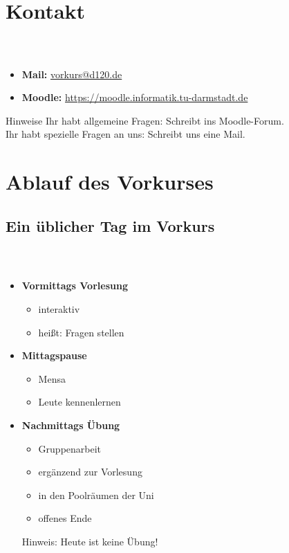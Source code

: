 \section{Kontakt}
\begin{frame}
	\frametitle{\insertsectionhead \\ \insertsubsectionhead}
	\begin{itemize}
		\item \textbf{Mail:} \href{mailto:vorkurs@d120.de}{vorkurs@d120.de}
		\item \textbf{Moodle:}  \href{https://moodle.informatik.tu-darmstadt.de/course/view.php?id=624} {https://moodle.informatik.tu-darmstadt.de}
	\end{itemize}
	\vspace{3.5cm}
	\begin{alertblock}{Hinweise}
		Ihr habt allgemeine Fragen: Schreibt ins Moodle-Forum. \\
		Ihr habt spezielle Fragen an uns: Schreibt uns eine Mail.
	\end{alertblock}
\end{frame}

\section{Ablauf des Vorkurses}
\subsection{Ein üblicher Tag im Vorkurs}
\begin{frame}
	\frametitle{\insertsectionhead \\ {\small \insertsubsectionhead }}
	\begin{itemize}
		\item \textbf{Vormittags Vorlesung}
		\begin{itemize}
			\item interaktiv
			\item heißt: Fragen stellen
		\end{itemize}
		\item \textbf{Mittagspause}
		\begin{itemize}
			\item Mensa
			\item Leute kennenlernen
		\end{itemize}
		\item \textbf{Nachmittags Übung}
		\begin{itemize}
			\item Gruppenarbeit
			\item ergänzend zur Vorlesung
			\item in den Poolräumen der Uni
			\item offenes Ende
		\end{itemize}
		\begin{block}{Hinweis:}
			Heute ist keine Übung!
		\end{block}
	\end{itemize}
\end{frame}

